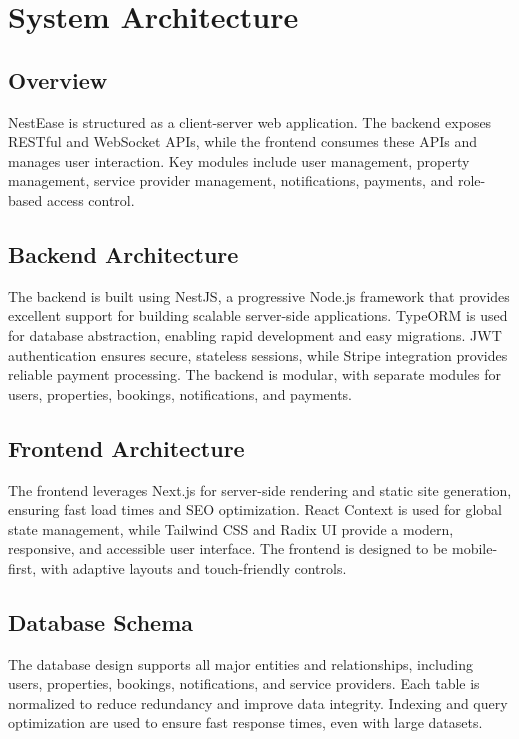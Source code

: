 \documentclass[conference]{IEEEtran}
\begin{document}
\section{System Architecture}
\subsection{Overview}
NestEase is structured as a client-server web application. The backend exposes RESTful and WebSocket APIs, while the frontend consumes these APIs and manages user interaction. Key modules include user management, property management, service provider management, notifications, payments, and role-based access control.

\subsection{Backend Architecture}
The backend is built using NestJS, a progressive Node.js framework that provides excellent support for building scalable server-side applications. TypeORM is used for database abstraction, enabling rapid development and easy migrations. JWT authentication ensures secure, stateless sessions, while Stripe integration provides reliable payment processing. The backend is modular, with separate modules for users, properties, bookings, notifications, and payments.

\subsection{Frontend Architecture}
The frontend leverages Next.js for server-side rendering and static site generation, ensuring fast load times and SEO optimization. React Context is used for global state management, while Tailwind CSS and Radix UI provide a modern, responsive, and accessible user interface. The frontend is designed to be mobile-first, with adaptive layouts and touch-friendly controls.

\subsection{Database Schema}
The database design supports all major entities and relationships, including users, properties, bookings, notifications, and service providers. Each table is normalized to reduce redundancy and improve data integrity. Indexing and query optimization are used to ensure fast response times, even with large datasets.
\end{document}
